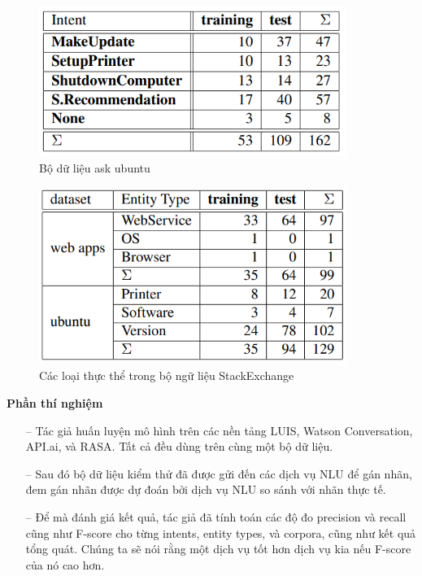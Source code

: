 \begin{figure}[htp]
    \centering
    \includegraphics[width=10cm]{images/comparisonimg/askubuntudatasets.png}
    \caption{Bộ dữ liệu ask ubuntu}
    \label{fig:comparisonimg-askubuntudatasets}
\end{figure}

\begin{figure}[htp]
    \centering
    \includegraphics[width=10cm]{images/comparisonimg/entityTypesStackExchange.png}
    \caption{Các loại thực thể trong bộ ngữ liệu StackExchange}
    \label{fig:comparisonimg-entityTypesStackExchange}
\end{figure}

\textbf{Phần thí nghiệm}

\begin{itemize}
    \item[--] Tác giả huấn luyện mô hình trên các nền tảng LUIS, Watson Conversation, API.ai, và RASA. Tất cả đều dùng trên cùng một bộ dữ liệu.
        \item[--]Sau đó bộ dữ liệu kiểm thử đã được gửi đến các dịch vụ NLU để gán nhãn, đem gán nhãn được dự đoán bởi dịch vụ NLU so sánh với nhãn thực tế.
        \item[--]Để mà đánh giá kết quả, tác giả đã tính toán các độ đo precision và recall cũng như F-score cho từng intents, entity types, và corpora, cũng như kết quả tổng quát. Chúng ta sẽ nói rằng một dịch vụ tốt hơn dịch vụ kia nếu F-score của nó cao hơn.
\end{itemize}

